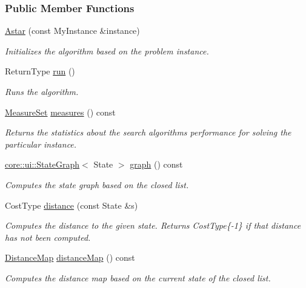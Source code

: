 \subsubsection*{Public Member Functions}
\begin{DoxyCompactItemize}
\item 
\hyperlink{structslb_1_1ext_1_1algorithm_1_1Astar_a2d3050a9cc4dddc9f48b7c42d11d68c9}{Astar} (const My\+Instance \&instance)
\begin{DoxyCompactList}\small\item\em Initializes the algorithm based on the problem instance. \end{DoxyCompactList}\item 
Return\+Type \hyperlink{structslb_1_1ext_1_1algorithm_1_1Astar_af46d0fe401539d7ae297dc4d059f5b5f}{run} ()
\begin{DoxyCompactList}\small\item\em Runs the algorithm. \end{DoxyCompactList}\item 
\hyperlink{structslb_1_1core_1_1sb_1_1MeasureSet}{Measure\+Set} \hyperlink{structslb_1_1ext_1_1algorithm_1_1Astar_a936b71c860389ebadb17ee8afaba875f}{measures} () const 
\begin{DoxyCompactList}\small\item\em Returns the statistics about the search algorithm\textquotesingle{}s performance for solving the particular instance. \end{DoxyCompactList}\item 
\hyperlink{structslb_1_1core_1_1ui_1_1StateGraph}{core\+::ui\+::\+State\+Graph}$<$ State $>$ \hyperlink{structslb_1_1ext_1_1algorithm_1_1Astar_a15d6101b6dc84cb71e290c3fcdcb44b9}{graph} () const 
\begin{DoxyCompactList}\small\item\em Computes the state graph based on the closed list. \end{DoxyCompactList}\item 
Cost\+Type \hyperlink{structslb_1_1ext_1_1algorithm_1_1Astar_a67abf0fa88aebf52c644731701a0dd70}{distance} (const State \&s)
\begin{DoxyCompactList}\small\item\em Computes the distance to the given state. Returns Cost\+Type\{-\/1\} if that distance has not been computed. \end{DoxyCompactList}\item 
\hyperlink{structslb_1_1ext_1_1algorithm_1_1Astar_a210d1f8bc1c2e97e626deb1051de2b2b}{Distance\+Map} \hyperlink{structslb_1_1ext_1_1algorithm_1_1Astar_a2c129f68cc11d10fefa4fa40d58ba6a2}{distance\+Map} () const 
\begin{DoxyCompactList}\small\item\em Computes the distance map based on the current state of the closed list. \end{DoxyCompactList}\end{DoxyCompactItemize}

